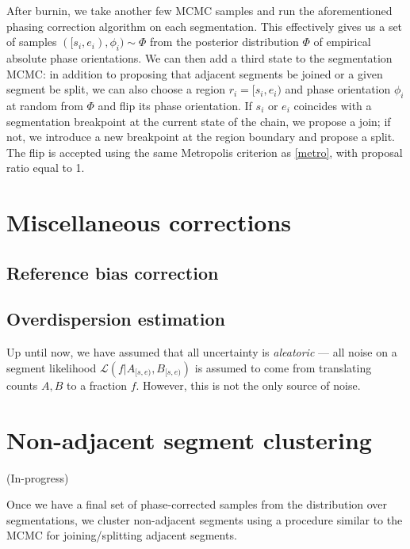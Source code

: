 \documentclass[10pt,letter]{article}
\numberwithin{equation}{section}
\begin{document}
After burnin, we take another few MCMC samples and run the aforementioned phasing correction algorithm on each segmentation. This effectively gives us a set of samples $([s_i,e_i),\phi_i)\sim\Phi$ from the posterior distribution $\Phi$ of empirical absolute phase orientations. We can then add a third state to the segmentation MCMC: in addition to proposing that adjacent segments be joined or a given segment be split, we can also choose a region $r_i=[s_i,e_i)$ and phase orientation $\phi_i$ at random from $\Phi$ and flip its phase orientation. If $s_i$ or $e_i$ coincides with a segmentation breakpoint at the current state of the chain, we propose a join; if not, we introduce a new breakpoint at the region boundary and propose a split. The flip is accepted using the same Metropolis criterion as \eqref{metro}, with proposal ratio equal to 1.

\section{Miscellaneous corrections}

\subsection{Reference bias correction}

\subsection{Overdispersion estimation}

Up until now, we have assumed that all uncertainty is \textit{aleatoric} --- all noise on a segment likelihood $\mathcal{L}(f|A_{[s,e)},B_{[s,e)})$ is assumed to come from translating counts $A,B$ to a fraction $f$. However, this is not the only source of noise. 


\section{Non-adjacent segment clustering}

(In-progress)

\noindent Once we have a final set of phase-corrected samples from the distribution over segmentations, we cluster non-adjacent segments using a procedure similar to the MCMC for joining/splitting adjacent segments.
\end{document}
